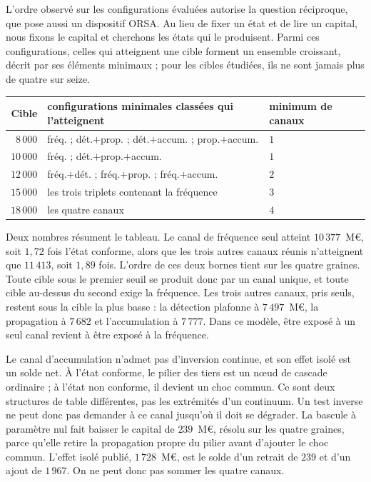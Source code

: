 L'ordre observé sur les configurations évaluées autorise la question réciproque, que pose aussi un dispositif ORSA. Au lieu de fixer un
état et de lire un capital, nous fixons le capital et cherchons les états qui le produisent.
Parmi ces configurations, celles qui atteignent une cible forment un ensemble croissant, décrit par
ses éléments minimaux ; pour les cibles étudiées, ils ne sont jamais plus de quatre sur seize.

\begin{center}\footnotesize
\renewcommand{\arraystretch}{1.2}
\begin{tabular}{@{}r l l@{}}
\toprule
\textbf{Cible} & \textbf{configurations minimales classées qui l'atteignent} & \textbf{minimum de canaux} \\
\midrule
$8\,000$ & fréq. ; dét.$+$prop. ; dét.$+$accum. ; prop.$+$accum. & $1$ \\
$10\,000$ & fréq. ; dét.$+$prop.$+$accum. & $1$ \\
$12\,000$ & fréq.$+$dét. ; fréq.$+$prop. ; fréq.$+$accum. & $2$ \\
$15\,000$ & les trois triplets contenant la fréquence & $3$ \\
$18\,000$ & les quatre canaux & $4$ \\
\bottomrule
\end{tabular}
\end{center}

\vspace{4pt}
\noindent Deux nombres résument le tableau. Le canal de fréquence seul atteint $10\,377$~M\euro, soit
$1{,}72$ fois l'état conforme, alors que les trois autres canaux réunis n'atteignent que $11\,413$,
soit $1{,}89$ fois. L'ordre de ces deux bornes tient sur les quatre graines. Toute cible sous le
premier seuil se produit donc par un canal unique, et toute cible au-dessus du second exige la
fréquence. Les trois autres canaux, pris seuls, restent sous la cible la plus basse : la détection plafonne à
$7\,497$~M\euro, la propagation à $7\,682$ et l'accumulation à $7\,777$. Dans ce modèle, être exposé à un
seul canal revient à être exposé à la fréquence.

Le canal d'accumulation n'admet pas d'inversion continue, et son effet isolé est un solde net. À
l'état conforme, le pilier des tiers est un n\oe{}ud de cascade ordinaire ; à l'état non conforme, il devient
un choc commun. Ce sont deux structures de table différentes, pas les extrémités d'un continuum. Un test inverse ne
peut donc pas demander à ce canal jusqu'où il doit se dégrader. La bascule à paramètre nul
fait baisser le capital de $239$~M\euro, résolu sur les quatre graines, parce qu'elle retire la
propagation propre du pilier avant d'ajouter le choc commun. L'effet isolé publié, $1\,728$~M\euro{},
est le solde d'un retrait de $239$ et d'un ajout de $1\,967$. On ne peut donc pas sommer les quatre
canaux.

